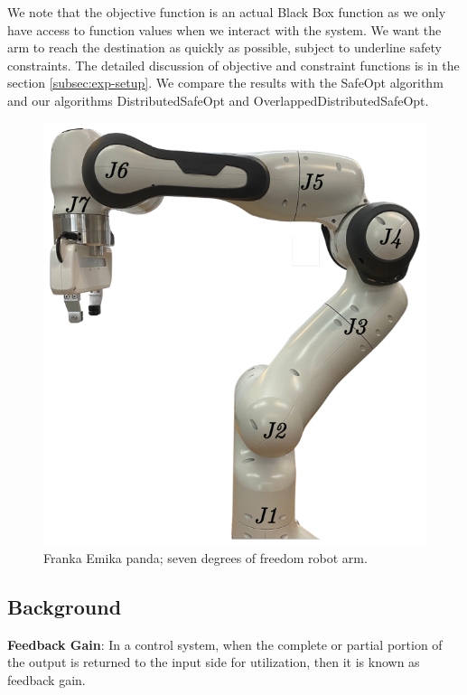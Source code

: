 We note that the objective function is an actual Black Box function as we only have access to function values when we interact with the system. We want the arm to reach the destination as quickly as possible, subject to underline safety constraints. The detailed discussion of objective and constraint functions is in the section \ref{subsec:exp-setup}. We compare the results with the SafeOpt algorithm and our algorithms DistributedSafeOpt and OverlappedDistributedSafeOpt.
\begin{figure}[H]
	\centering
	\includegraphics[scale=0.2]{figures/panda-robot.png}
	\caption{Franka Emika panda; seven degrees of freedom robot arm.}
	\label{fig:panda-robot}
\end{figure}

\subsection{Background}
\label{subsec:robot-prob-bg}
\hspace*{0.7cm}\textbf{Feedback Gain}: In a control system, when the complete or partial portion of the output is returned to the input side for utilization, then it is known as feedback gain.


